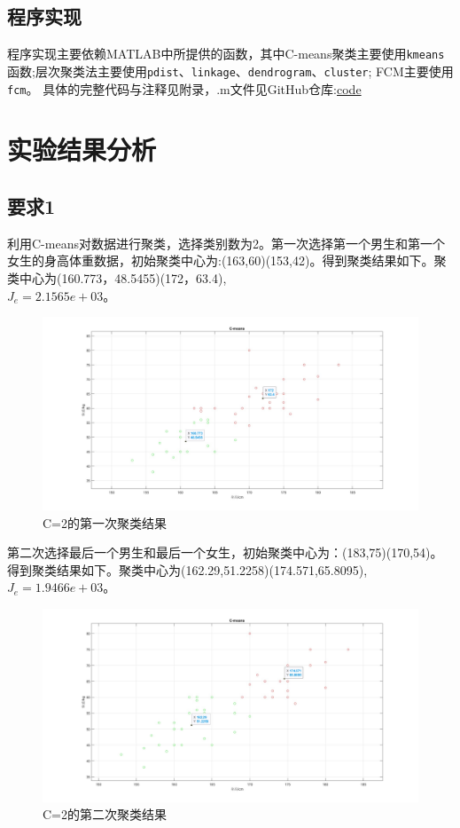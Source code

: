 \documentclass{article}
\begin{document}
\subsection{程序实现}
程序实现主要依赖MATLAB中所提供的函数，其中C-means聚类主要使用\verb|kmeans|函数;层次聚类法主要使用\verb|pdist|、\verb|linkage|、\verb|dendrogram|、\verb|cluster|;
FCM主要使用\verb|fcm|。
具体的完整代码与注释见附录，.m文件见GitHub仓库:\quad \href{https://github.com/Shi5013/HomeWork2022/tree/main/PatternRecognition}{code}

\section{实验结果分析}

\subsection{要求1}
利用C-means对数据进行聚类，选择类别数为2。第一次选择第一个男生和第一个女生的身高体重数据，初始聚类中心为:(163,60)(153,42)。得到聚类结果如下。聚类中心为(160.773，48.5455)(172，63.4),\\$J_e = 2.1565e+03$。

\begin{figure}[H]
    \centering
    \includegraphics[width=1\textwidth]{image/Figure02.jpg}
    \caption{C=2的第一次聚类结果}
    \label{Figure02}
\end{figure}

第二次选择最后一个男生和最后一个女生，初始聚类中心为：(183,75)(170,54)。得到聚类结果如下。聚类中心为(162.29,51.2258)(174.571,65.8095),\\$J_e = 1.9466e+03$。

\begin{figure}[H]
    \centering
    \includegraphics[width=1\textwidth]{image/Figure03.jpg}
    \caption{C=2的第二次聚类结果}
    \label{Figure03}
\end{figure}
\end{document}
